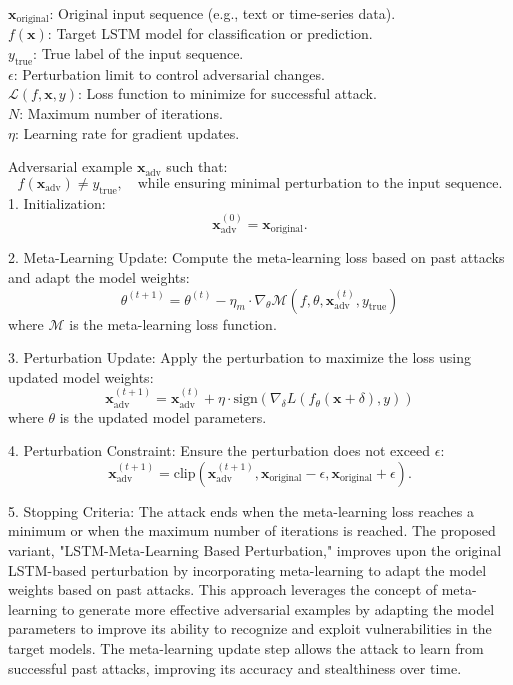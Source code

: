 $\mathbf{x}_{\text{original}}$: Original input sequence (e.g., text or time-series data). \\
$f(\mathbf{x})$: Target LSTM model for classification or prediction. \\
$y_{\text{true}}$: True label of the input sequence. \\
$\epsilon$: Perturbation limit to control adversarial changes. \\
$\mathcal{L}(f, \mathbf{x}, y)$: Loss function to minimize for successful attack. \\
$N$: Maximum number of iterations. \\
$\eta$: Learning rate for gradient updates.

Adversarial example $\mathbf{x}_{\text{adv}}$ such that:
\[
f(\mathbf{x}_{\text{adv}}) \neq y_{\text{true}}, \quad \text{while ensuring minimal perturbation to the input sequence}.
\]
1. Initialization:
   \[
   \mathbf{x}_{\text{adv}}^{(0)} = \mathbf{x}_{\text{original}}.
   \]

2. Meta-Learning Update:
   Compute the meta-learning loss based on past attacks and adapt the model weights:
   \[
   \theta^{(t+1)} = \theta^{(t)} - \eta_{m} \cdot \nabla_{\theta} \mathcal{M}(f, \theta, \mathbf{x}_{\text{adv}}^{(t)}, y_{\text{true}})
   \]
   where $\mathcal{M}$ is the meta-learning loss function.

3. Perturbation Update:
   Apply the perturbation to maximize the loss using updated model weights:
   \[
   \mathbf{x}_{\text{adv}}^{(t+1)} = \mathbf{x}_{\text{adv}}^{(t)} + \eta \cdot \text{sign}(\nabla_\delta L(f_{\theta}(\mathbf{x} + \delta), y))
   \]
   where $\theta$ is the updated model parameters.

4. Perturbation Constraint:
   Ensure the perturbation does not exceed $\epsilon$:
   \[
   \mathbf{x}_{\text{adv}}^{(t+1)} = \text{clip}(\mathbf{x}_{\text{adv}}^{(t+1)}, \mathbf{x}_{\text{original}} - \epsilon, \mathbf{x}_{\text{original}} + \epsilon).
   \]

5. Stopping Criteria:
   The attack ends when the meta-learning loss reaches a minimum or when the maximum number of iterations is reached.
The proposed variant, "LSTM-Meta-Learning Based Perturbation," improves upon the original LSTM-based perturbation by incorporating meta-learning to adapt the model weights based on past attacks. This approach leverages the concept of meta-learning to generate more effective adversarial examples by adapting the model parameters to improve its ability to recognize and exploit vulnerabilities in the target models. The meta-learning update step allows the attack to learn from successful past attacks, improving its accuracy and stealthiness over time.